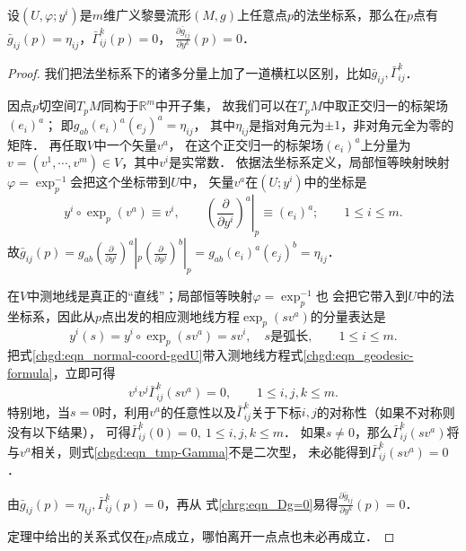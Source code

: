 \begin{theorem}\label{chgd:thm_RNC}
    设$(U,\varphi;y^i)$是$m$维广义黎曼流形$(M,g)$上任意点$p$的法坐标系，那么在$p$点有
    $\bar{g}_{ij}(p)=\eta_{ij}$，$\bar{\Gamma}_{ij}^k(p)=0$，
    $\frac{\partial \bar{g}_{ij}}{\partial y^k}(p)=0$．
\end{theorem}
\begin{proof}
    我们把法坐标系下的诸多分量上加了一道横杠以区别，比如$\bar{g}_{ij},\bar{\Gamma}_{ij}^k$．

    因点$p$切空间$T_pM$同构于$\mathbb{R}^m$中开子集，
    故我们可以在$T_pM$中取正交归一的标架场$(e_i)^a$；
    即$g_{ab}(e_i)^a(e_j)^a= \eta_{ij}$，
    其中$\eta_{ij}$是指对角元为$\pm 1$，非对角元全为零的矩阵．
    再任取$V$中一个矢量$v^a$，
    在这个正交归一的标架场$(e_i)^a$上分量为$v=(v^1,\cdots,v^m)\in V$，其中$v^i$是实常数．
    依据法坐标系定义，局部恒等映射映射$\varphi = \exp_{p}^{-1}$会把这个坐标带到$U$中，
    矢量$v^a$在$(U;y^i)$中的坐标是
    \begin{equation}\label{chgd:eqn_normal-coord}
        y^i\circ\exp_{p}(v^a) \equiv v^i, \qquad
        \left.\left(\frac{\partial}{\partial y^i}\right)^a\right|_{p} \equiv (e_i)^a;
        \qquad 1\leqslant i\leqslant m.
    \end{equation}
    故$\bar{g}_{ij}(p)=g_{ab} (\frac{\partial}{\partial y^i})^a|_{p} (\frac{\partial}{\partial y^j})^b|_{p}
    =g_{ab}(e_i)^a(e_j)^b=\eta_{ij}$．

    在$V$中测地线是真正的“直线”；局部恒等映射$\varphi = \exp_{p}^{-1}$也
    会把它带入到$U$中的法坐标系，因此从$p$点出发的相应测地线方程$\exp_{p}(sv^a)$的分量表达是
    \begin{equation}\label{chgd:eqn_normal-coord-gedU}
        y^i(s)= y^i\circ \exp_{p}(s v^a) = s v^i,\quad s\text{是弧长},  \qquad 1\leqslant i\leqslant m.
    \end{equation}
    把式\eqref{chgd:eqn_normal-coord-gedU}带入测地线方程式\eqref{chgd:eqn_geodesic-formula}，立即可得
    \begin{equation}\label{chgd:eqn_tmp-Gamma}
        v^i v^j \bar{\Gamma}_{ij}^k(s v^a) = 0 ,\qquad 1\leqslant i,j,k\leqslant m .
    \end{equation}
    特别地，当$s=0$时，利用$v^a$的任意性以及$\bar{\Gamma}_{ij}^k$关于下标$i,j$的对称性（如果不对称则没有以下结果），
    可得$\bar{\Gamma}_{ij}^k(0)=0,\ 1\leqslant i,j,k\leqslant m $．
    如果$s\neq 0$，那么$\bar{\Gamma}_{ij}^k(s v^a)$将与$v^a$相关，则式\eqref{chgd:eqn_tmp-Gamma}不是二次型，
    未必能得到$\bar{\Gamma}_{ij}^k(s v^a)=0$．

    由$\bar{g}_{ij}(p)=\eta_{ij}, \bar{\Gamma}_{ij}^k(p)=0$，再从
    式\eqref{chrg:eqn_Dg=0}易得$\frac{\partial \bar{g}_{ij}}{\partial y^k}(p)=0$．


    定理中给出的关系式仅在$p$点成立，哪怕离开一点点也未必再成立．
\end{proof}

